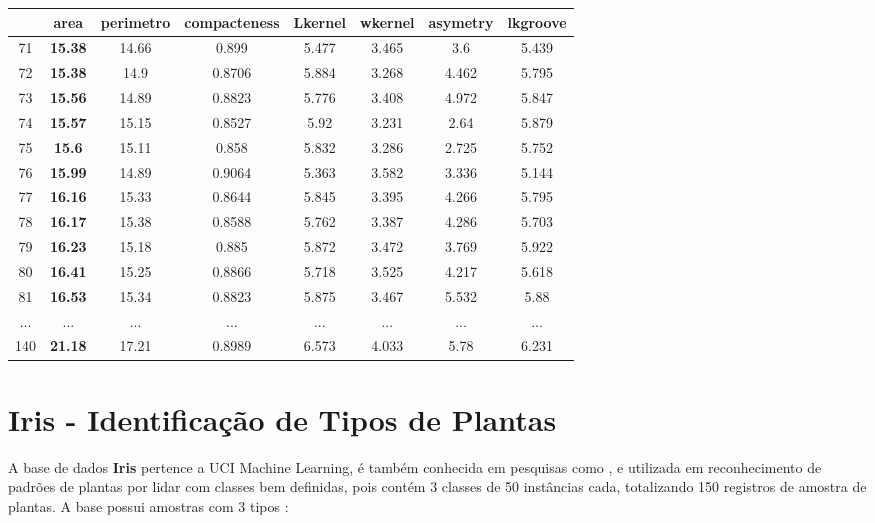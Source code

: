 \begin{table}[!ht]
{\begin{tabular}{|c|c|c|c|c|c|c|c|}
& \textbf{area} & \textbf{perimetro} & compacteness & Lkernel & wkernel & asymetry &lkgroove \\ \hline
\rowcolor[HTML]{EFEFEF} 
71 & \textbf{15.38} & 14.66 & 0.899 & 5.477 & 3.465 & 3.6 & 5.439\\ \hline 
\rowcolor[HTML]{EFEFEF}
72 & \textbf{15.38} & 14.9 & 0.8706 & 5.884 & 3.268 & 4.462 & 5.795\\ \hline 
\rowcolor[HTML]{EFEFEF}
73 & \textbf{15.56} & 14.89 & 0.8823 & 5.776 & 3.408 & 4.972 & 5.847\\ \hline 
\rowcolor[HTML]{EFEFEF}
74 & \textbf{15.57} & 15.15 & 0.8527 & 5.92 & 3.231 & 2.64 & 5.879\\ \hline 
\rowcolor[HTML]{EFEFEF}
75 & \textbf{15.6} & 15.11 & 0.858 & 5.832 & 3.286 & 2.725 & 5.752\\ \hline 
\rowcolor[HTML]{EFEFEF}
76 & \textbf{15.99} & 14.89 & 0.9064 & 5.363 & 3.582 & 3.336 & 5.144\\ \hline 
77 & \textbf{16.16} & 15.33 & 0.8644 & 5.845 & 3.395 & 4.266 & 5.795\\ \hline 
78 & \textbf{16.17} & 15.38 & 0.8588 & 5.762 & 3.387 & 4.286 & 5.703\\ \hline 
\rowcolor[HTML]{EFEFEF}
79 & \textbf{16.23} & 15.18 & 0.885 & 5.872 & 3.472 & 3.769 & 5.922\\ \hline 
80 & \textbf{16.41} & 15.25 & 0.8866 & 5.718 & 3.525 & 4.217 & 5.618\\ \hline 
81 & \textbf{16.53} & 15.34 & 0.8823 & 5.875 & 3.467 & 5.532 & 5.88\\ \hline 
...& ... & ... & ... & ... & ... & ... & ...\\ \hline 
140 & \textbf{21.18} & 17.21 & 0.8989 & 6.573 & 4.033 & 5.78 & 6.231\\ \hline 

\end{tabular}
    }
    
 \label{tab:analise:seeds:cluster2}
\end{table}




\section{Iris - Identificação de Tipos de Plantas}


A base de dados \textbf{Iris} pertence a UCI Machine Learning, é também conhecida em pesquisas como , e utilizada em reconhecimento de padrões de plantas por lidar com classes bem definidas, pois contém 3 classes de 50 instâncias cada, totalizando  150 registros de amostra de plantas. A base possui amostras com 3 tipos \cite{FISHER1936}:

